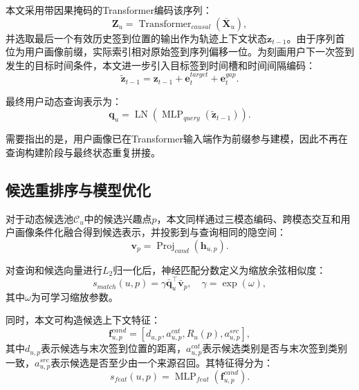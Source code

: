\documentclass{rjthesis}
\begin{document}
本文采用带因果掩码的Transformer编码该序列：
\begin{equation}
\mathbf Z_u=\operatorname{Transformer}_{causal}(\overline{\mathbf X}_u),
\end{equation}
并选取最后一个有效历史签到位置的输出作为轨迹上下文状态$\mathbf z_{t-1}$。由于序列首位为用户画像前缀，实际索引相对原始签到序列偏移一位。为刻画用户下一次签到发生的目标时间条件，本文进一步引入目标签到时间槽和时间间隔编码：
\begin{equation}
\widetilde{\mathbf z}_{t-1}=\mathbf z_{t-1}+\mathbf e_t^{target}+\mathbf e_t^{gap}.
\end{equation}

最终用户动态查询表示为：
\begin{equation}
\mathbf q_u=\operatorname{LN}(\operatorname{MLP}_{query}(\widetilde{\mathbf z}_{t-1})).
\end{equation}

需要指出的是，用户画像已在Transformer输入端作为前缀参与建模，因此不再在查询构建阶段与最终状态重复拼接。

\subsection{候选重排序与模型优化}

对于动态候选池$\mathcal C_u$中的候选兴趣点$p$，本文同样通过三模态编码、跨模态交互和用户画像条件化融合得到候选表示，并投影到与查询相同的隐空间：
\begin{equation}
\mathbf v_p=\operatorname{Proj}_{cand}(\mathbf h_{u,p}).
\end{equation}

对查询和候选向量进行$L_2$归一化后，神经匹配分数定义为缩放余弦相似度：
\begin{equation}
s_{match}(u,p)=\gamma \bar{\mathbf q}_u^{\top}\bar{\mathbf v}_p,
\quad \gamma=\exp(\omega),
\end{equation}
其中$\omega$为可学习缩放参数。


同时，本文可构造候选上下文特征：
\begin{equation}
\mathbf f_{u,p}^{cand}=[d_{u,p},a_{u,p}^{cat},R_u(p),a_{u,p}^{src}],
\end{equation}
其中$d_{u,p}$表示候选与末次签到位置的距离，$a_{u,p}^{cat}$表示候选类别是否与末次签到类别一致，$a_{u,p}^{src}$表示候选是否至少由一个来源召回。其特征得分为：
\begin{equation}
s_{feat}(u,p)=\operatorname{MLP}_{feat}(\mathbf f_{u,p}^{cand}).
\end{equation}
\end{document}
